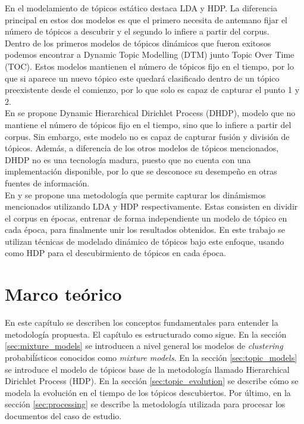 \documentclass[letterpaper,12pt,oneside]{book} %
\begin{document}
En el modelamiento de tópicos estático destaca LDA y HDP. La diferencia principal en estos dos modelos es que el primero necesita de antemano fijar el número de tópicos a descubrir y el segundo lo infiere a partir del corpus.\\

Dentro de los primeros modelos de tópicos dinámicos que fueron exitosos podemos encontrar a Dynamic Topic Modelling (DTM) junto Topic Over Time (TOC)\citep{wang2006topics}. Estos modelos mantienen el número de tópicos fijo en el tiempo, por lo que si aparece un nuevo tópico este quedará clasificado dentro de un tópico preexistente desde el comienzo, por lo que solo es capaz de capturar el punto 1 y 2.\\

En \citep{ahmed2012timeline} se propone Dynamic Hierarchical Dirichlet Process (DHDP), modelo que no mantiene el número de tópicos fijo en el tiempo, sino que lo infiere a partir del corpus. Sin embargo, este modelo no es capaz de capturar fusión y división de tópicos. Además, a diferencia de los otros modelos de tópicos mencionados, DHDP no es una tecnología madura, puesto que no cuenta con una implementación disponible, por lo que se desconoce su desempeño en otras fuentes de información.\\

En \citep{wilson2011tracking} y \citep{beykikhoshk2018discovering} se propone una metodología que permite capturar los dinámismos mencionados utilizando LDA y HDP respectivamente. Estas consisten en dividir el corpus en épocas, entrenar de forma independiente un modelo de tópico en cada época, para finalmente unir los resultados obtenidos. En este trabajo se utilizan técnicas de modelado dinámico de tópicos bajo este enfoque, usando como HDP para el descubirmiento de tópicos en cada época.


\chapter{Marco teórico}
En este capítulo se describen los conceptos fundamentales para entender la metodología propuesta. El capítulo es estructurado como sigue. En la sección \ref{sec:mixture_models} se introducen a nivel general los modelos de \textit{clustering} probabiĺísticos conocidos como \textit{mixture models}. En la sección \ref{sec:topic_models} se introduce el modelo de tópicos base de la metodología llamado Hierarchical Dirichlet Process (HDP). En la sección \ref{sec:topic_evolution} se describe cómo se modela la evolución en el tiempo de los tópicos descubiertos. Por último, en la sección \ref{sec:processing} se describe la metodología utilizada para procesar los documentos del caso de estudio.
\end{document}

